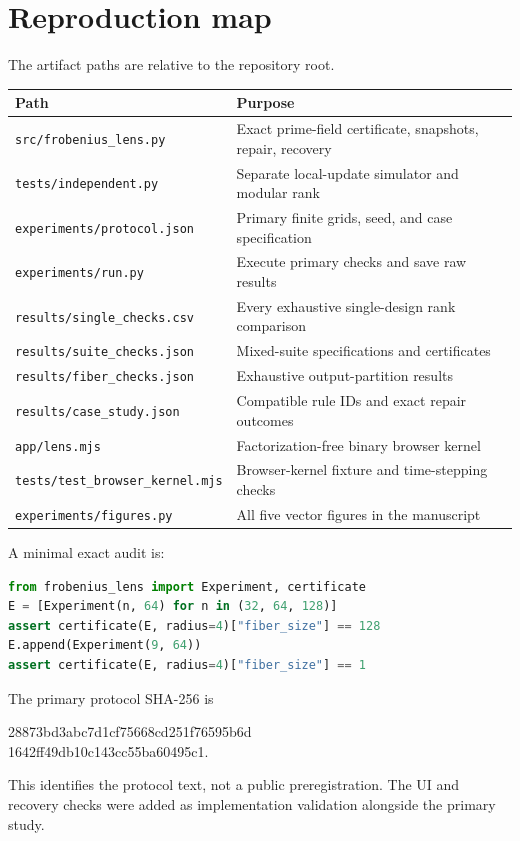 \documentclass[11pt]{article}
\begin{document}
\section{Reproduction map}
The artifact paths are relative to the repository root.
\begin{table}[h]
\centering\small
\begin{tabular}{@{}p{.44\linewidth}p{.48\linewidth}@{}}
\toprule
Path & Purpose\\\midrule
\texttt{src/frobenius\_lens.py} & Exact prime-field certificate, snapshots, repair, recovery\\
\texttt{tests/independent.py} & Separate local-update simulator and modular rank\\
\texttt{experiments/protocol.json} & Primary finite grids, seed, and case specification\\
\texttt{experiments/run.py} & Execute primary checks and save raw results\\
\texttt{results/single\_checks.csv} & Every exhaustive single-design rank comparison\\
\texttt{results/suite\_checks.json} & Mixed-suite specifications and certificates\\
\texttt{results/fiber\_checks.json} & Exhaustive output-partition results\\
\texttt{results/case\_study.json} & Compatible rule IDs and exact repair outcomes\\
\texttt{app/lens.mjs} & Factorization-free binary browser kernel\\
\texttt{tests/test\_browser\_kernel.mjs} & Browser-kernel fixture and time-stepping checks\\
\texttt{experiments/figures.py} & All five vector figures in the manuscript\\\bottomrule
\end{tabular}
\end{table}

A minimal exact audit is:
\begin{lstlisting}[language=Python]
from frobenius_lens import Experiment, certificate
E = [Experiment(n, 64) for n in (32, 64, 128)]
assert certificate(E, radius=4)["fiber_size"] == 128
E.append(Experiment(9, 64))
assert certificate(E, radius=4)["fiber_size"] == 1
\end{lstlisting}
The primary protocol SHA-256 is
\begin{center}\small\ttfamily
28873bd3abc7d1cf75668cd251f76595b6d\\
1642ff49db10c143cc55ba60495c1.
\end{center}
This identifies the protocol text, not a public preregistration. The UI and recovery checks were added as implementation validation alongside the primary study.
\end{document}
